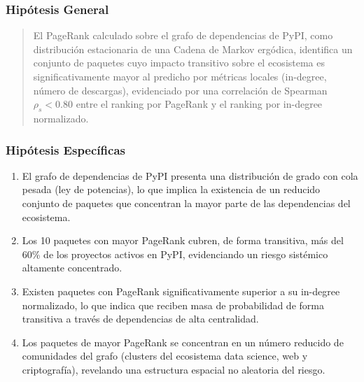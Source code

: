 \subsubsection{Hipótesis General}
\begin{quote}
El PageRank calculado sobre el grafo de dependencias de PyPI, como distribución
estacionaria de una Cadena de Markov ergódica, identifica un conjunto de paquetes
cuyo impacto transitivo sobre el ecosistema es significativamente mayor al
predicho por métricas locales (in-degree, número de descargas), evidenciado por
una correlación de Spearman $\rho_s < 0.80$ entre el ranking por PageRank y
el ranking por in-degree normalizado.
\end{quote}

\subsubsection{Hipótesis Específicas}
\begin{enumerate}[label=\textbf{H\arabic*.}]
    \item El grafo de dependencias de PyPI presenta una distribución de grado con
          cola pesada (ley de potencias), lo que implica la existencia de un
          reducido conjunto de paquetes que concentran la mayor parte de las
          dependencias del ecosistema.
    \item Los 10 paquetes con mayor PageRank cubren, de forma transitiva, más
          del 60\% de los proyectos activos en PyPI, evidenciando un riesgo
          sistémico altamente concentrado.
    \item Existen paquetes con PageRank significativamente superior a su in-degree
          normalizado, lo que indica que reciben masa de probabilidad de forma
          transitiva a través de dependencias de alta centralidad.
    \item Los paquetes de mayor PageRank se concentran en un número reducido de
          comunidades del grafo (clusters del ecosistema data science, web y
          criptografía), revelando una estructura espacial no aleatoria del riesgo.
\end{enumerate}
